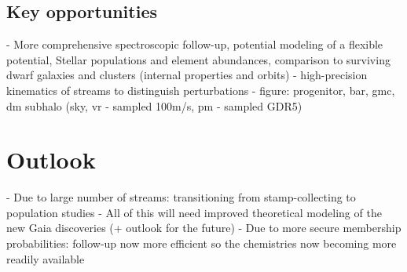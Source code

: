 \documentclass[final,5p,times,twocolumn,authoryear]{elsarticle}
\begin{document}
% 
% 
% 
% 
% 
% 
% 
% 

\subsection{Key opportunities}
- More comprehensive spectroscopic follow-up, potential modeling of a flexible potential, Stellar populations and element abundances, comparison to surviving dwarf galaxies and clusters (internal properties and orbits)
- high-precision kinematics of streams to distinguish perturbations
- figure: progenitor, bar, gmc, dm subhalo (sky, vr - sampled 100m/s, pm - sampled GDR5)


\section{Outlook}
\label{sec:outlook}
- Due to large number of streams: transitioning from stamp-collecting to population studies
- All of this will need improved theoretical modeling of the new Gaia discoveries (+ outlook for the future)
- Due to more secure membership probabilities: follow-up now more efficient so the chemistries now becoming more readily available







\end{document}
